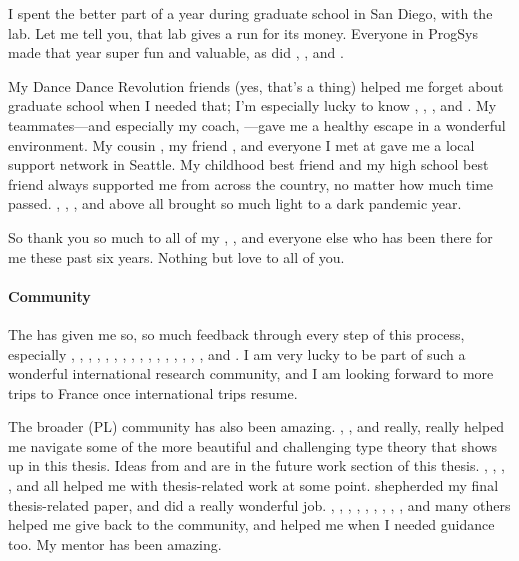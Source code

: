 I spent the better part of a year during graduate school in San Diego, with the  lab.
Let me tell you, that lab gives  a run for its money.
Everyone in ProgSys made that year super fun and valuable,
as did , , and .

My Dance Dance Revolution friends (yes, that's a thing) helped me forget about graduate school when I needed that;
I'm especially lucky to know , , , and .
My  teammates---and especially my coach, ---gave me a healthy escape in a wonderful environment.
My cousin , my friend , and everyone I met at  gave me a local support network in Seattle.
My childhood best friend  and my high school best friend  always supported me from across the country,
no matter how much time passed. , , , and above all  brought so much light to a dark pandemic year.

So thank you so much to all of my , , and everyone else who has been there for me these past six years.
Nothing but love to all of you.

\paragraph{Community}
The  has given me so, so much feedback through every step of this process,
especially , , , , , , , , , , , , , , , , and .
I am very lucky to be part of such a wonderful international research community, and I am looking forward to more trips to France
once international trips resume.

The broader  (PL) community has also been amazing.
, , and  really, really helped me navigate
some of the more beautiful and challenging type theory that shows up in this thesis.
Ideas from  and  are in the future work section of this thesis.
, , , , and  all helped me with
thesis-related work at some point.
 shepherded my final thesis-related paper, and did a really wonderful job.
, , , ,
, , , , , and many others helped me give back to the community,
and helped me when I needed guidance too.
My mentor  has been amazing.

